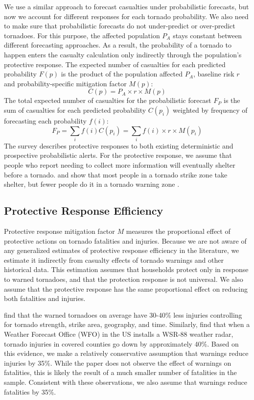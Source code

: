 \documentclass{ametsocV6.1}
\begin{document}
We use a similar approach to forecast casualties under probabilistic forecasts, but now we account for different responses for each tornado probability. We also need to make sure that probabilistic forecasts do not under-predict or over-predict tornadoes. For this purpose, the affected population $P_A$ stays constant between different forecasting approaches. As a result, the probability of a tornado to happen enters the casualty calculation only indirectly through the population's protective response. The expected number of casualties for each predicted probability $F(p)$ is the product of the population affected $P_A$, baseline risk $r$ and probability-specific mitigation factor $M(p)$:
$$C(p) = P_A \times r \times M(p)$$
The total expected number of casualties for the probabilistic forecast $F_P$ is the sum of casualties for each predicted probability $C(p_i)$ weighted by frequency of forecasting each probability $f(i)$:
$$F_P=\sum_i f(i)C(p_i)=\sum_i f(i) \times r  \times M(p_i)$$
The survey describes protective responses to both existing deterministic and prospective probabilistic alerts. For the protective response, we assume that people who report needing to collect more information will eventually shelter before a tornado. \citet{hammer_response_2002} and \citet{klockow_investigation_2011} show that most people in a tornado strike zone take shelter, but fewer people do it in a tornado warning zone \citep*{liu_assessment_1996, sherman-morris_tornado_2010}.

\vspace{10pt}
\subsection{Protective Response Efficiency} 
Protective response mitigation factor $M$ measures the proportional effect of protective actions on tornado fatalities and injuries. Because we are not aware of any generalized estimates of protective response efficiency in the literature, we estimate it indirectly from casualty effects of tornado warnings and other historical data. This estimation assumes that households protect only in response to warned tornadoes, and that the protection response is not universal. We also assume that the protective response has the same proportional effect on reducing both fatalities and injuries.

\citet{simmons_false_2009} find that the warned tornadoes on average have 30-40\% less injuries controlling for tornado strength, strike area, geography, and time. Similarly, \citet{simmons_wsr-88d_2005} find that when a Weather Forecast Office (WFO) in the US installs a WSR-88 weather radar, tornado injuries in covered counties go down by approximately 40\%. Based on this evidence, we make a relatively conservative assumption that warnings reduce injuries by 35\%. While the paper does not observe the effect of warnings on fatalities, this is likely the result of a much smaller number of fatalities in the sample. Consistent with these observations, we also assume that warnings reduce fatalities by 35\%.
\end{document}
